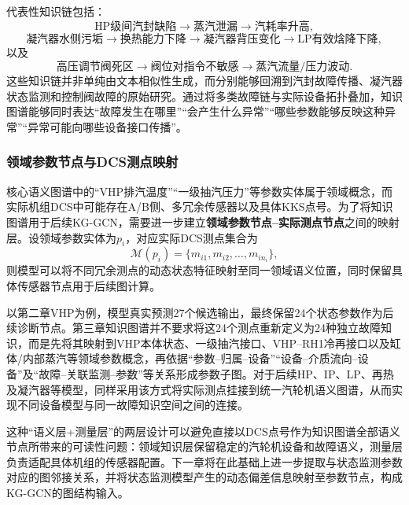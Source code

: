 代表性知识链包括：
\begin{equation}
\text{HP级间汽封缺陷}\rightarrow\text{蒸汽泄漏}\rightarrow\text{汽耗率升高},
\end{equation}
\begin{equation}
\text{凝汽器水侧污垢}\rightarrow\text{换热能力下降}\rightarrow\text{凝汽器背压变化}\rightarrow\text{LP有效焓降下降},
\end{equation}
以及
\begin{equation}
\text{高压调节阀死区}\rightarrow\text{阀位对指令不敏感}\rightarrow\text{蒸汽流量/压力波动}.
\end{equation}
这些知识链并非单纯由文本相似性生成，而分别能够回溯到汽封故障传播、凝汽器状态监测和控制阀故障的原始研究\cite{ZhangHu2021FaultPropagationGNN,Medica2018CondenserCondition,ZhangHu2021ControlValveGraph}。通过将多类故障链与实际设备拓扑叠加，知识图谱能够同时表达“故障发生在哪里”“会产生什么异常”“哪些参数能够反映这种异常”“异常可能向哪些设备接口传播”。

\subsubsection{领域参数节点与DCS测点映射}

核心语义图谱中的“VHP排汽温度”“一级抽汽压力”等参数实体属于领域概念，而实际机组DCS中可能存在A/B侧、多冗余传感器以及具体KKS点号。为了将知识图谱用于后续KG-GCN，需要进一步建立\textbf{领域参数节点--实际测点节点}之间的映射层。设领域参数实体为$p_i$，对应实际DCS测点集合为
\begin{equation}
\mathcal{M}(p_i)=\{m_{i1},m_{i2},\ldots,m_{in_i}\},
\end{equation}
则模型可以将不同冗余测点的动态状态特征映射至同一领域语义位置，同时保留具体传感器节点用于后续图计算。

以第二章VHP为例，模型真实预测27个候选输出，最终保留24个状态参数作为后续诊断节点。第三章知识图谱并不要求将这24个测点重新定义为24种独立故障知识，而是先将其映射到VHP本体状态、一级抽汽接口、VHP--RH1冷再接口以及缸体/内部蒸汽等领域参数概念，再依据“参数--归属--设备”“设备--介质流向--设备”及“故障--关联监测--参数”等关系形成参数子图。对于后续HP、IP、LP、再热及凝汽器等模型，同样采用该方式将实际测点挂接到统一汽轮机语义图谱，从而实现不同设备模型与同一故障知识空间之间的连接。

这种“语义层+测量层”的两层设计可以避免直接以DCS点号作为知识图谱全部语义节点所带来的可读性问题：领域知识层保留稳定的汽轮机设备和故障语义，测量层负责适配具体机组的传感器配置。下一章将在此基础上进一步提取与状态监测参数对应的图邻接关系，并将状态监测模型产生的动态偏差信息映射至参数节点，构成KG-GCN的图结构输入。


